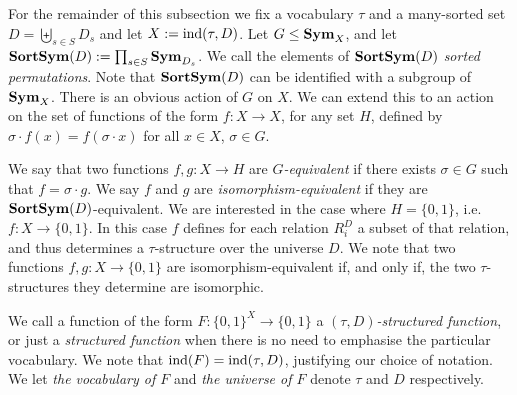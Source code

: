 \documentclass[../paper.tex]{subfiles}
\begin{document}
For the remainder of this subsection we fix a vocabulary $\tau$ and a
many-sorted set $D=\biguplus_{s \in S} D_{s}$ and let $X := \text{\upshape ind} (\tau, D)$. Let
$G \leq \text{\textbf{Sym}}_{X}$, and let $\text{\textbf{SortSym}}(D) := \prod_{s \in S} \text{\textbf{Sym}}_{D_{s}}$. We
call the elements of $\text{\textbf{SortSym}}(D)$ \emph{sorted permutations}. Note that
$\text{\textbf{SortSym}}(D)$ can be identified with a subgroup of $\text{\textbf{Sym}}_X$. There is an obvious
action of $G$ on $X$. We can extend this to an action on the set of functions of
the form $f: X \rightarrow X$, for any set $H$, defined by $\sigma \cdot f(x) =
f(\sigma \cdot x)$ for all $x \in X$, $\sigma \in G$.

We say that two functions $f, g : X \rightarrow H$ are \emph{$G$-equivalent} if
there exists $\sigma \in G$ such that $f = \sigma \cdot g$. We say $f$ and $g$
are \emph{isomorphism-equivalent} if they are $\text{\textbf{SortSym}}(D)$-equivalent. We are
interested in the case where $H = \{0,1\}$, i.e.\ $f : X \rightarrow \{0,1\}$.
In this case $f$ defines for each relation $R^D_i$ a subset of that relation,
and thus determines a $\tau$-structure over the universe $D$. We note that two
functions $f, g: X \rightarrow \{0,1\}$ are isomorphism-equivalent if, and only
if, the two $\tau$-structures they determine are isomorphic.

We call a function of the form $F:\{0,1\}^{X} \rightarrow \{0,1\}$ a
\emph{$(\tau, D)$-structured function}, or just a \emph{structured function}
when there is no need to emphasise the particular vocabulary. We note that
$\text{\upshape ind}(F) = \text{\upshape ind}(\tau, D)$, justifying our choice of notation. We let \emph{the
  vocabulary of $F$} and \emph{the universe of $F$} denote $\tau$ and $D$
respectively.


\end{document}
